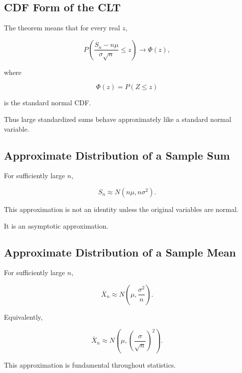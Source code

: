 \subsection{CDF Form of the CLT}
\label{subsec:cdf-form-clt}

The theorem means that for every real \(z\),

\[
\boxed{
P
\left(
\frac{
S_n-n\mu
}{
\sigma\sqrt{n}
}
\leq z
\right)
\to
\Phi(z),
}
\]

where

\[
\Phi(z)
=
P(Z\leq z)
\]

is the standard normal CDF.

Thus large standardized sums behave approximately like a standard
normal variable.

\subsection{Approximate Distribution of a Sample Sum}
\label{subsec:approx-distribution-sum-clt}

For sufficiently large \(n\),

\[
\boxed{
S_n
\approx
N
\left(
n\mu,
n\sigma^2
\right).
}
\]

This approximation is not an identity unless the original variables are
normal.

It is an asymptotic approximation.

\subsection{Approximate Distribution of a Sample Mean}
\label{subsec:approx-distribution-mean-clt}

For sufficiently large \(n\),

\[
\boxed{
\overline{X}_n
\approx
N
\left(
\mu,
\frac{\sigma^2}{n}
\right).
}
\]

Equivalently,

\[
\boxed{
\overline{X}_n
\approx
N
\left(
\mu,
\left(
\frac{\sigma}{\sqrt{n}}
\right)^2
\right).
}
\]

This approximation is fundamental throughout statistics.

